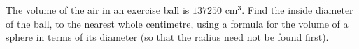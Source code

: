 The volume of the air in an exercise ball is $137250\text{ cm}^3$. Find the inside diameter of the ball, to the nearest whole centimetre, using a formula for the volume of a sphere in terms of its diameter (so that the radius need not be found first).
